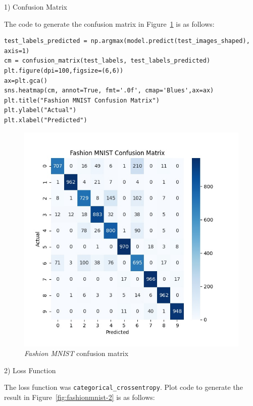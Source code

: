 \documentclass[12pt, letterpaper]{article}
\begin{document}
{\large 1) Confusion Matrix}

The code to generate the confusion matrix in Figure~\ref{fig:fashionmnist-1} is as follows:

\begin{mdframed}[backgroundcolor=bg]
\begin{verbatim}
test_labels_predicted = np.argmax(model.predict(test_images_shaped), axis=1)
cm = confusion_matrix(test_labels, test_labels_predicted)
plt.figure(dpi=100,figsize=(6,6))
ax=plt.gca()
sns.heatmap(cm, annot=True, fmt='.0f', cmap='Blues',ax=ax)
plt.title("Fashion MNIST Confusion Matrix")
plt.ylabel("Actual")
plt.xlabel("Predicted")
\end{verbatim}
\end{mdframed}

\begin{figure}
\includegraphics[width=\linewidth]{colab_fashion_mnist_cm.jpeg}
\caption{\textit{Fashion MNIST} confusion matrix}
\label{fig:fashionmnist-1}
\end{figure}

{\large 2) Loss Function}

The loss function was \texttt{categorical\_crossentropy}. Plot code to generate the result in Figure~\ref{fig:fashionmnist-2} is as follows:
\end{document}
